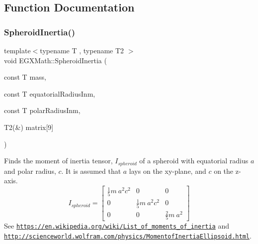 \subsection{Function Documentation}
\mbox{\label{group___e_g_x_math-_geometry-3_d-_spheroid-_inertia_ga4a6085f1b3504bd682ee6818542ae09e}} 
\subsubsection{\texorpdfstring{Spheroid\+Inertia()}{SpheroidInertia()}\hspace{0.1cm}{\footnotesize\ttfamily [1/3]}}
{\footnotesize\ttfamily template$<$typename T , typename T2 $>$ \\
void E\+G\+X\+Math\+::\+Spheroid\+Inertia (\begin{DoxyParamCaption}\item[{const T}]{mass,  }\item[{const T}]{equatorial\+Radius\+Inm,  }\item[{const T}]{polar\+Radius\+Inm,  }\item[{T2(\&)}]{matrix\mbox{[}9\mbox{]} }\end{DoxyParamCaption})}



Finds the moment of inertia tensor, $I_{spheroid}$ of a spheroid with equatorial radius $a$ and polar radius, $c$. It is assumed that $a$ lays on the xy-\/plane, and $c$ on the z-\/axis. \[ I_{spheroid}=\begin{bmatrix} \frac{1}{5}m\ a^2c^2 & 0 & 0\\ 0 & \frac{1}{5}m\ a^2c^2 & 0\\ 0 & 0 & \frac{2}{5}m\ a^2 \end{bmatrix} \] See \href{https://en.wikipedia.org/wiki/List_of_moments_of_inertia}{\tt https\+://en.\+wikipedia.\+org/wiki/\+List\+\_\+of\+\_\+moments\+\_\+of\+\_\+inertia} and \href{http://scienceworld.wolfram.com/physics/MomentofInertiaEllipsoid.html}{\tt http\+://scienceworld.\+wolfram.\+com/physics/\+Momentof\+Inertia\+Ellipsoid.\+html}. 


